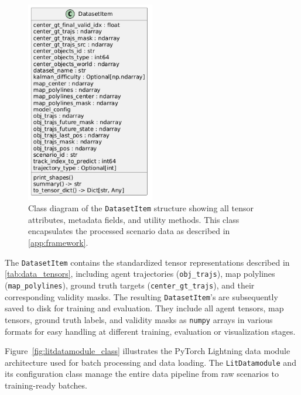 \begin{figure}[H]
\centering
\includegraphics[width=0.5\textwidth]{figures/classes_DataSetItem.png}
\caption{Class diagram of the \texttt{DatasetItem} structure showing all tensor attributes, metadata fields, and utility methods. This class encapsulates the processed scenario data as described in \autoref{app:framework}.}
\label{fig:datasetitem_class}
\end{figure}

The \texttt{DatasetItem} contains the standardized tensor representations described in \autoref{tab:data_tensors}, including agent trajectories (\texttt{obj\_trajs}), map polylines (\texttt{map\_polylines}), ground truth targets (\texttt{center\_gt\_trajs}), and their corresponding validity masks. The resulting \texttt{DatasetItem}'s are subsequently saved to disk for training and evaluation. They include all agent tensors, map tensors, ground truth labels, and validity masks as \texttt{numpy} arrays in various formats for easy handling at different training, evaluation or visualization stages.

Figure~\ref{fig:litdatamodule_class} illustrates the PyTorch Lightning data module architecture used for batch processing and data loading. The \texttt{LitDatamodule} and its configuration class manage the entire data pipeline from raw scenarios to training-ready batches.

